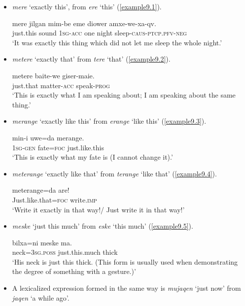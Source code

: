 \documentclass[output=paper,colorlinks,citecolor=brown]{langscibook}
\begin{document}
\begin{itemize}
\item  \textit{mere} ‘exactly this’, from \textit{ere} ‘this’ (\ref{example9.1}).

\ea
    \label{example9.1}
    \gll mere 		jilgan mim-be 		eme 	diower 	amxe-we-xa-qv.\\
    just.this 	sound 1\textsc{sg-acc} 	one 	night   sleep-\textsc{caus-ptcp.pfv-neg}\\
    \glt `It was exactly this thing which did not let me sleep the whole night.'\\
    \z

\item  \textit{metere} ‘exactly that’ from \textit{tere} ‘that’ (\ref{example9.2}).

\ea
    \label{example9.2}
    \gll metere 		baite-we 	giser-maie.\\
    just.that 	matter-\textsc{acc} 	speak-\textsc{prog}\\
    \glt `This is exactly what I am speaking about; I am speaking about the same thing.'\\
    \z

\item  \textit{merange} ‘exactly like this’ from \textit{erange} ‘like this’ (\ref{example9.3}).

\ea
    \label{example9.3}
    \gll min-i 		uwe=da 	merange.\\
    1\textsc{sg-gen} 	fate=\textsc{foc} 		just.like.this\\
    \glt `This is exactly what my fate is (I cannot change it).'\\
    \z

\item  \textit{meterange} ‘exactly like that’ from \textit{terange} ‘like that’ (\ref{example9.4}).

\ea
    \label{example9.4}
    \gll meterange=da 		are!\\
    Just.like.that=\textsc{foc} 		write.\textsc{imp}\\
    \glt `Write it exactly in that way!/ Just write it in that way!'\\
    \z

\item  \textit{meske} ‘just this much’ from \textit{eske} ‘this much’ (\ref{example9.5}).

\ea
    \label{example9.5}
    \gll bilxa=ni 		meske 		ma.\\
    neck=3\textsc{sg.poss}		just.this.much	thick\\
    \glt `His neck is just this thick. (This form is usually used when demonstrating the degree of something with a gesture.)'\\
    \z

\item  A lexicalized expression formed in the same way is \textit{mujaqen} ‘just now’ from \textit{jaqen} ‘a while ago’.
\end{itemize}
\end{document}
